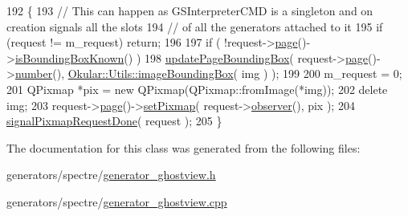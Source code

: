 \begin{DoxyCode}
192 \{
193     \textcolor{comment}{// This can happen as GSInterpreterCMD is a singleton and on creation signals all the slots}
194     \textcolor{comment}{// of all the generators attached to it}
195     \textcolor{keywordflow}{if} (request != m\_request) \textcolor{keywordflow}{return};
196 
197     \textcolor{keywordflow}{if} ( !request->\hyperlink{classOkular_1_1PixmapRequest_a83b5e81f2e908e70f3c19a0a3c07fab3}{page}()->\hyperlink{classOkular_1_1Page_a19690d5696075b6e93a5a6ea578ca09e}{isBoundingBoxKnown}() )
198         \hyperlink{classOkular_1_1Generator_acc2aae181c392cb58e42eaa8d35213ef}{updatePageBoundingBox}( request->\hyperlink{classOkular_1_1PixmapRequest_a83b5e81f2e908e70f3c19a0a3c07fab3}{page}()->\hyperlink{classOkular_1_1Page_a6eee5f157a130b47d81ddd63e501664b}{number}(), 
      \hyperlink{classOkular_1_1Utils_af1d97967ffcdda70bbc4ddb293da5020}{Okular::Utils::imageBoundingBox}( img ) );
199 
200     m\_request = 0;
201     QPixmap *pix = \textcolor{keyword}{new} QPixmap(QPixmap::fromImage(*img));
202     \textcolor{keyword}{delete} img;
203     request->\hyperlink{classOkular_1_1PixmapRequest_a83b5e81f2e908e70f3c19a0a3c07fab3}{page}()->\hyperlink{classOkular_1_1Page_ae7e45a6647904b01ebe84930b73f1d79}{setPixmap}( request->\hyperlink{classOkular_1_1PixmapRequest_af7abb325ca484ded40c556cf0ad5b793}{observer}(), pix );
204     \hyperlink{classOkular_1_1Generator_abed0ea73d02be9c4a0afcd920882faf5}{signalPixmapRequestDone}( request );
205 \}
\end{DoxyCode}


The documentation for this class was generated from the following files\+:\begin{DoxyCompactItemize}
\item 
generators/spectre/\hyperlink{generator__ghostview_8h}{generator\+\_\+ghostview.\+h}\item 
generators/spectre/\hyperlink{generator__ghostview_8cpp}{generator\+\_\+ghostview.\+cpp}\end{DoxyCompactItemize}
